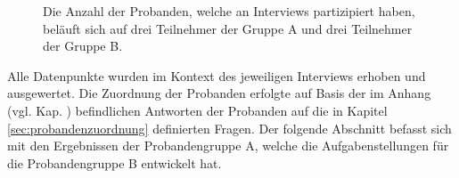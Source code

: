 \begin{figure}[h]
  \centering
    \caption{Die Anzahl der Probanden, welche an Interviews partizipiert haben, beläuft sich auf drei Teilnehmer der Gruppe A und drei Teilnehmer der Gruppe B.}
    \label{fig:104_interview-count}
\end{figure}

Alle Datenpunkte wurden im Kontext des jeweiligen Interviews erhoben und ausgewertet. 
Die Zuordnung der Probanden erfolgte auf Basis der im Anhang (vgl. Kap. ) befindlichen Antworten der Probanden auf die in Kapitel \ref{sec:probandenzuordnung} definierten Fragen.
Der folgende Abschnitt befasst sich mit den Ergebnissen der Probandengruppe A, welche die Aufgabenstellungen für die Probandengruppe B entwickelt hat.


